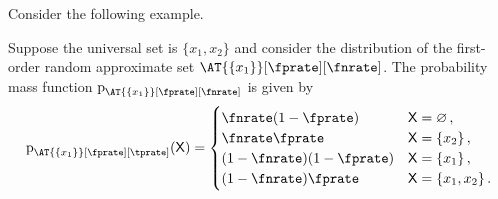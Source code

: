 \documentclass[ ../main.tex]{subfiles}
\begin{document}





Consider the following example.
\begin{example}
	Suppose the universal set is $\{ x_1,x_2 \}$ and consider the distribution of the first-order random approximate set $\AT{\{x_1\}}[\fprate][\fnrate]$.
	The probability mass function $\Fun{p}_{\AT{\{x_1\}}[\fprate][\fnrate]}$ is given by
	\begin{equation}
	\Fun{p}_{\AT{\{x_1\}}[\fprate][\tprate]}(\Set{X}) =
	\begin{cases} 
	\fnrate (1-\fprate) & \Set{X} = \EmptySet\,,\\
	\fnrate \fprate     & \Set{X} = \{x_2\}\,,\\
	(1-\fnrate)(1-\fprate)     & \Set{X} = \{x_1\}\,,\\
	(1-\fnrate)\fprate         & \Set{X} = \{x_1,x_2\}\,.
	\end{cases}
	\end{equation}
\end{example}
\end{document}
